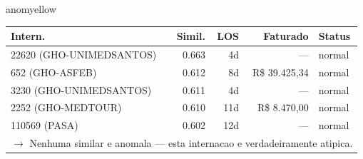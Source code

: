 \documentclass[a4paper,10pt]{article}
\begin{document}
\begin{anomalycard}[Internacao 4019 | GHO-PETROBRAS | MODERADO (z=2.14)]{anomyellow}
\begin{tabular}{l r r r l}\toprule\textbf{Intern.} & \textbf{Simil.} & \textbf{LOS} & \textbf{Faturado} & \textbf{Status} \\\midrule
22620 (GHO-UNIMEDSANTOS) & 0.663 & 4d & --- & \textcolor{jcubeblue}{normal} \\
652 (GHO-ASFEB) & 0.612 & 8d & R\$ 39.425,34 & \textcolor{jcubeblue}{normal} \\
3230 (GHO-UNIMEDSANTOS) & 0.611 & 4d & --- & \textcolor{jcubeblue}{normal} \\
2252 (GHO-MEDTOUR) & 0.610 & 11d & R\$ 8.470,00 & \textcolor{jcubeblue}{normal} \\
110569 (PASA) & 0.602 & 12d & --- & \textcolor{jcubeblue}{normal} \\
\multicolumn{5}{l}{\textcolor{jcubeblue}{\small $\rightarrow$ Nenhuma similar e anomala --- esta internacao e verdadeiramente atipica.}} \\
\bottomrule\end{tabular}


\end{anomalycard}

\newpage
\end{document}
